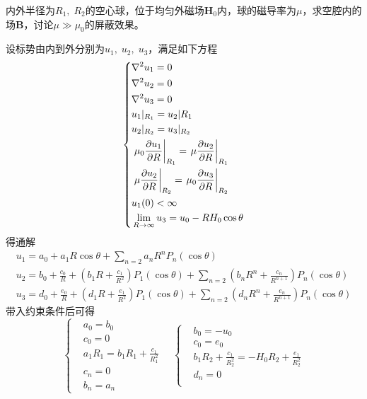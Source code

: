 \documentclass{mynote}
\begin{document}
\begin{exercise}{3.10}
    内外半径为$R_1,\; R_2$的空心球，位于均匀外磁场$\bm{H}_0$内，球的磁导率为$\mu$，求空腔内的场$\bm{B}$，讨论$\mu \gg \mu_0$的屏蔽效果。
\end{exercise}
\begin{solution}
设标势由内到外分别为$u_1,\; u_2,\; u_3$，满足如下方程
\[
\left\{
    \begin{aligned}
        & \nabla ^2 u_1 = 0 \\
        & \nabla ^2 u_2 = 0 \\
        & \nabla ^2 u_3 = 0 \\
        & u_1|_{R_1} = u_2|{R_1} \\
        & u_2|_{R_2} = u_3|_{R_2} \\
        & \left. \mu_0 \dfrac{\partial u_1}{\partial R} \right|_{R_1} = \left. \mu \dfrac{\partial u_2}{\partial R} \right|_{R_1} \\
        & \left. \mu \dfrac{\partial u_2}{\partial R} \right|_{R_2} = \left. \mu_0 \dfrac{\partial u_3}{\partial R} \right|_{R_2} \\
        & u_1(0) < \infty \\
        & \lim_{R \to \infty} u_3 = u_0 - RH_0 \cos \theta
    \end{aligned} 
\right.    
\]
得通解
\begin{gather*}
    u_1 = a_0 + a_1 R \cos \theta + \sum_{n=2} a_n R^n P_n(\cos \theta) \\
    u_2 = b_0 + \frac{c_0}{R} + (b_1 R + \frac{c_1}{R^2})P_1(\cos \theta) + \sum_{n=2} (b_nR^n + \frac{c_n}{R^{n+1}}) P_n(\cos \theta) \\
    u_3 = d_0 + \frac{e_0}{R} + (d_1 R + \frac{e_1}{R^2})P_1(\cos \theta) + \sum_{n=2} (d_nR^n + \frac{e_n}{R^{n+1}}) P_n(\cos \theta) 
\end{gather*}
带入约束条件后可得
\[
\left\{
    \begin{aligned}
        & a_0 = b_0 \\
        & c_0 = 0 \\
        & a_1 R_1 = b_1 R_1 + \frac{c_1}{R_1^2} \\
        & c_n = 0 \\
        & b_n = a_n
    \end{aligned} 
\right.
\quad\left\{
    \begin{aligned}
        & b_0 = -u_0 \\
        & c_0 = e_0 \\
        & b_1 R_2 + \frac{c_1}{R_2^2} = -H_0 R_2 + \frac{e_1}{R_2^2} \\
        & d_n = 0\\

\end{aligned}\]
\end{solution}
\end{document}
